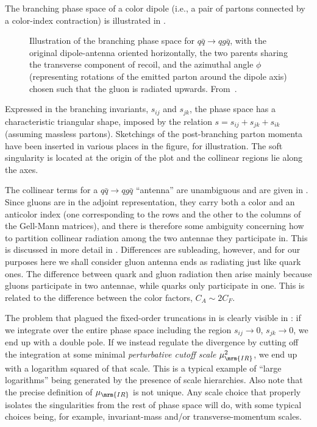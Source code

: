 The branching phase space of a color dipole (i.e., a pair of partons
connected by a color-index contraction) is illustrated
in . 
\begin{figure}[t]
\centering
\vspace*{5mm}

\caption{Illustration of the branching phase space for $q\bar{q}\to
  qg\bar{q}$, with the original dipole-antenna oriented
  horizontally, the two parents
  sharing the transverse component of recoil, and the azimuthal angle
  $\phi$ (representing rotations of the emitted parton 
  around the dipole axis) chosen such
  that the gluon is radiated upwards. From~\cite{Giele:2011cb}.
\label{fig:branchingps}}
\end{figure}
Expressed in the branching invariants, $s_{ij}$ and $s_{jk}$, the
phase space has a characteristic triangular shape, imposed by the
relation $s = s_{ij} + s_{jk} + s_{ik}$ (assuming massless
partons). Sketchings of the post-branching parton momenta have been
inserted in various places in the figure, for illustration. The soft
singularity is located at the origin of the plot and the collinear
regions lie along the axes. 

The collinear terms for a $q\bar{q}\to qg\bar{q}$ ``antenna'' are
unambiguous and are  
given in . Since gluons are in the adjoint
representation, they carry both a color and an anticolor index 
(one corresponding to the rows and the other to the
columns of the Gell-Mann matrices), and there is therefore some
ambiguity concerning how to partition collinear radiation among the two
antennae they participate in. This is discussed in more detail
in \cite{Giele:2011cb}. Differences are subleading, however, and for
our purposes here we shall consider gluon antenna ends as radiating
just like quark ones. The difference between quark and gluon
radiation then arise mainly because gluons participate in two
antennae, while quarks only participate in one. This is related to the
difference between the color factors, $C_A \sim 2C_F$. 

The problem that plagued the fixed-order truncations
in  is clearly visible in : 
if we integrate over the
entire phase space including the region $s_{ij}\to 0$, $s_{jk}\to 0$,
we end up with a double pole. If we instead regulate the divergence by 
cutting off the integration at some minimal \emph{perturbative cutoff
  scale} $\mu_\mrm{IR}^2$, we end up with a logarithm squared of that
scale. This is
a typical example of ``large logarithms'' being generated by the
presence of scale hierarchies. Also note that 
the precise definition of $\mu_\mrm{IR}$ is not
  unique. Any scale choice that properly isolates the singularities
  from the rest of phase space will do, with some typical choices being, for
  example, invariant-mass and/or transverse-momentum scales.

